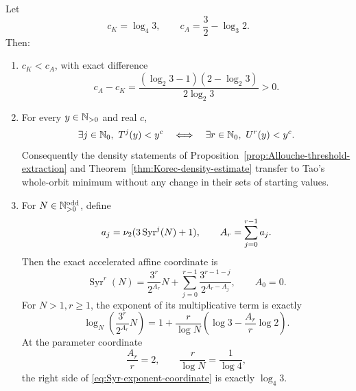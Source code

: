 \begin{proposition}
\label{prop:Tao-Korec-threshold-crosswalk}
Let
\[
 c_K=\log_4 3,
 \qquad
 c_A=\frac32-\log_3 2.
\]
Then:
\begin{enumerate}
\item \(c_K<c_A\), with exact difference
\begin{equation}
\label{eq:Tao-Korec-threshold-gap}
 c_A-c_K=
 \frac{(\log_2 3-1)(2-\log_2 3)}{2\log_2 3}>0.
\end{equation}
\item For every \(y\in\mathbb{N}_{>0}\) and real \(c\),
\begin{equation}
\label{eq:Tao-Korec-event-equality}
 \exists j\in\mathbb{N}_{0},\ T^j(y)<y^c
 \quad\Longleftrightarrow\quad
 \exists r\in\mathbb{N}_{0},\ U^r(y)<y^c.
\end{equation}
Consequently the density statements of
Proposition~\ref{prop:Allouche-threshold-extraction} and
Theorem~\ref{thm:Korec-density-estimate} transfer to Tao's whole-orbit
minimum without any change in their sets of starting values.
\item For \(N\in\mathbb{N}_{>0}^{\mathrm{odd}}\), define
\[
 a_j=\nu_{2}(3\operatorname{Syr}^j(N)+1),
 \qquad
 A_r=\sum_{j=0}^{r-1}a_j.
\]
Then the exact accelerated affine coordinate is
\begin{equation}
\label{eq:Syr-exact-affine-r}
 \operatorname{Syr}^r(N)
 =\frac{3^r}{2^{A_r}}N+
 \sum_{j=0}^{r-1}\frac{3^{r-1-j}}{2^{A_r-A_j}},
 \qquad A_0=0.
\end{equation}
For \(N>1,r\ge1\), the exponent of its multiplicative term is exactly
\begin{equation}
\label{eq:Syr-exponent-coordinate}
 \log_N\left(\frac{3^r}{2^{A_r}}N\right)
 =1+\frac{r}{\log N}
 \left(\log3-\frac{A_r}{r}\log2\right).
\end{equation}
At the parameter coordinate
\[
 \frac{A_r}{r}=2,\qquad
 \frac{r}{\log N}=\frac1{\log4},
\]
the right side of \eqref{eq:Syr-exponent-coordinate} is exactly
\(\log_4 3\).
\end{enumerate}
\end{proposition}

